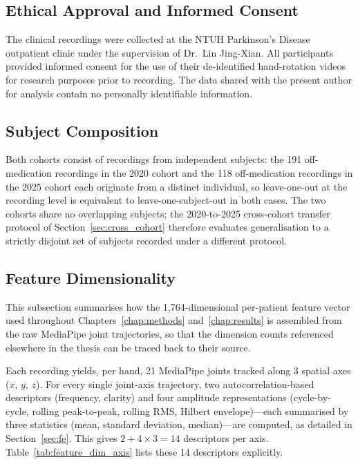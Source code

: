 \subsection{Ethical Approval and Informed Consent}
\label{sec:ethics}

The clinical recordings were collected at the NTUH Parkinson's Disease outpatient clinic under the supervision of Dr.~Lin Jing-Xian. All participants provided informed consent for the use of their de-identified hand-rotation videos for research purposes prior to recording. The data shared with the present author for analysis contain no personally identifiable information.

\subsection{Subject Composition}
\label{sec:subject_overlap}

Both cohorts consist of recordings from independent subjects: the 191 off-medication recordings in the 2020 cohort and the 118 off-medication recordings in the 2025 cohort each originate from a distinct individual, so leave-one-out at the recording level is equivalent to leave-one-subject-out in both cases. The two cohorts share no overlapping subjects; the 2020-to-2025 cross-cohort transfer protocol of Section~\ref{sec:cross_cohort} therefore evaluates generalisation to a strictly disjoint set of subjects recorded under a different protocol.

\subsection{Feature Dimensionality}
\label{sec:feature_dim}

This subsection summarises how the 1,764-dimensional per-patient feature vector used throughout Chapters~\ref{chap:methods} and~\ref{chap:results} is assembled from the raw MediaPipe joint trajectories, so that the dimension counts referenced elsewhere in the thesis can be traced back to their source.

Each recording yields, per hand, 21 MediaPipe joints tracked along 3 spatial axes ($x$, $y$, $z$). For every single joint-axis trajectory, two autocorrelation-based descriptors (frequency, clarity) and four amplitude representations (cycle-by-cycle, rolling peak-to-peak, rolling RMS, Hilbert envelope)---each summarised by three statistics (mean, standard deviation, median)---are computed, as detailed in Section~\ref{sec:fe}. This gives $2 + 4 \times 3 = 14$ descriptors per axis. Table~\ref{tab:feature_dim_axis} lists these 14 descriptors explicitly.

